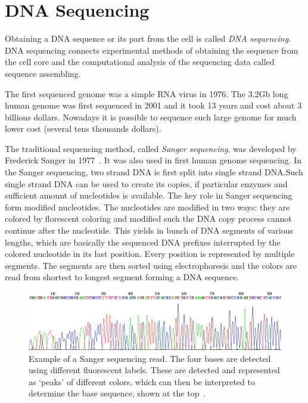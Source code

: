 \section{DNA Sequencing}

Obtaining a DNA sequence or its part from the cell is called \emph{DNA sequencing}.
DNA sequencing connects experimental methods of obtaining the sequence from the cell core and the computational analysis of the sequencing data called sequence assembling.

The first sequenced genome was a simple RNA virus in 1976. The 3.2Gb long human genome was first sequenced in 2001 and it took 13 years and cost about 3 billions dollars. Nowadays it is possible to sequence such large genome for much lower cost (several tens thousands dollars).

The traditional sequencing method, called \emph{Sanger sequencing}, was developed by Frederick Sanger in 1977~\cite{sanger1977dna}. It was also used in first human genome sequencing.
In the Sanger sequencing, two strand DNA is first split into single strand DNA.\@ Such single strand DNA can be used to create its copies, if particular enzymes and sufficient amount of nucleotides is available. The key role in Sanger sequencing form modified nucleotides. The nucleotides are modified in two ways: they are colored by florescent coloring and modified such the DNA copy process cannot continue after the nucleotide. This yields in bunch of DNA segments of various lengths, which are basically the sequenced DNA prefixes interrupted by the colored nucleotide in its last position. Every position is represented by multiple segments. The segments are then sorted using electrophoresis and the colors are read from shortest to longest segment forming a DNA sequence.

\begin{figure}[htbp]
  \centering
  \includegraphics[width=\textwidth]{../figures/sanger}
  \caption[Sanger sequencing]{Example of a Sanger sequencing read. The four bases are detected using different fluorescent labels. These are detected and represented as `peaks' of different colors, which can then be interpreted to determine the base sequence, shown at the top~\cite{wiki:sanger-img}.}\label{fig:sanger}
\end{figure}


